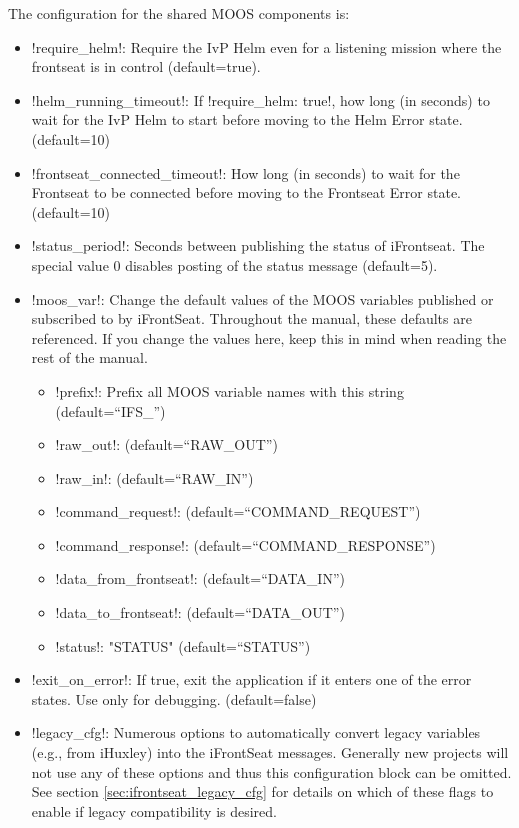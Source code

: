 The configuration for the shared MOOS components is:

\begin{itemize}
\item !require_helm!: Require the IvP Helm even for a listening mission where the frontseat is in control (default=true).
\item !helm_running_timeout!:  If !require_helm: true!, how long (in seconds) to wait for the IvP Helm to start before moving to the Helm Error state. (default=10)
\item !frontseat_connected_timeout!: How long (in seconds) to wait for the Frontseat to be connected before moving to the Frontseat Error state. (default=10)
\item !status_period!: Seconds between publishing the status of iFrontseat. The special value 0 disables posting of the status message (default=5).
\item !moos_var!: Change the default values of the MOOS variables published or subscribed to by iFrontSeat. Throughout the manual, these defaults are referenced. If you change the values here, keep this in mind when reading the rest of the manual.
\begin{itemize}
\item !prefix!: Prefix all MOOS variable names with this string (default=``IFS\_'')
\item !raw_out!: (default=``RAW\_OUT'')
\item !raw_in!: (default=``RAW\_IN'')
\item !command_request!: (default=``COMMAND\_REQUEST'')
\item !command_response!: (default=``COMMAND\_RESPONSE'')
\item !data_from_frontseat!: (default=``DATA\_IN'')
\item !data_to_frontseat!: (default=``DATA\_OUT'')
\item !status!: "STATUS" (default=``STATUS'')
\end{itemize}  
\item !exit_on_error!: If true, exit the application if it enters one of the error states. Use only for debugging. (default=false)
\item !legacy_cfg!: Numerous options to automatically convert legacy variables (e.g., from iHuxley) into the iFrontSeat messages. Generally new projects will not use any of these options and thus this configuration block can be omitted. See section \ref{sec:ifrontseat_legacy_cfg} for details on which of these flags to enable if legacy compatibility is desired.
\end{itemize}

